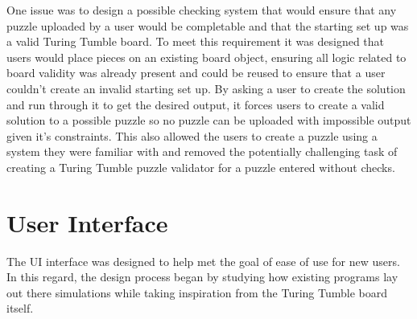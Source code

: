 \documentclass{l4proj}
\begin{document}
One issue was to design a possible checking system that would ensure that any puzzle uploaded by a user would be completable and that the starting set up was a valid Turing Tumble board. To meet this requirement it was designed that users would place pieces on an existing board object, ensuring all logic related to board validity was already present and could be reused to ensure that a user couldn't create an invalid starting set up. By asking a user to create the solution and run through it to get the desired output, it forces users to create a valid solution to a possible puzzle so no puzzle can be uploaded with impossible output given it's constraints. This also allowed the users to create a puzzle using a system they were familiar with and removed the potentially challenging task of creating a Turing Tumble puzzle validator for a puzzle entered without checks. 



\section{User Interface}
The UI interface was designed to help met the goal of ease of use for new users. In this regard, the design process began by studying how existing programs lay out there simulations while taking inspiration from the Turing Tumble board itself.
\end{document}
